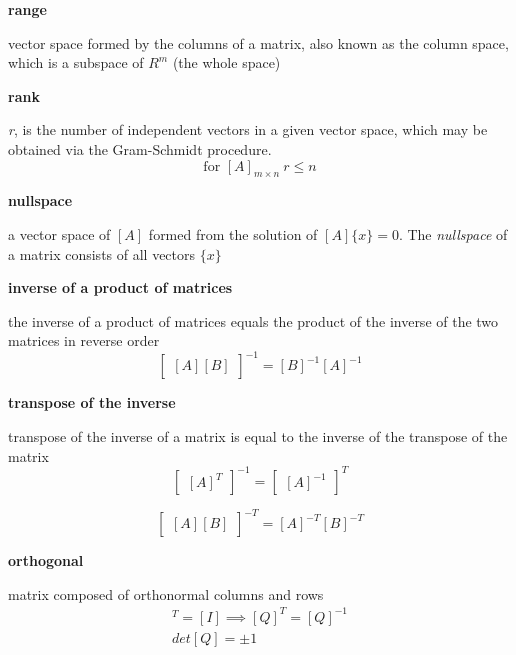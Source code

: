 \documentclass[letterpaper,reqno,oneside]{amsart}
\newenvironment{dd}[1]{
	\noindent
	\textbf{\normalsize{#1}}
	\hspace{0.1in}
	\small
	\rmfamily
	}
	{\medskip}
\begin{document}
\begin{dd}{range}
vector space formed by the columns of a matrix, also known as the column space, which is a subspace of $R^m$ (the whole space)
\end{dd}

\begin{dd}{rank}
\emph{r}, is the number of independent vectors in a given vector space, which may be obtained via the Gram-Schmidt procedure. $$\text{for } [A]_{m \times n} \ r \le n$$
\end{dd}

\begin{dd}{nullspace}
a vector space of $[A]$ formed from the solution of $[A]\{x\} = 0$. The \emph{nullspace} of a matrix consists of all vectors $\{x\}$ 
\end{dd}

\begin{dd}{inverse of a product of matrices}
the inverse of a product of matrices equals the product of the inverse of the two matrices in reverse order
\[
\begin{bmatrix}
[A][B]
\end{bmatrix}^{-1}
 = [B]^{-1}[A]^{-1} \]
\end{dd}

\begin{dd}{transpose of the inverse}
transpose of the inverse of a matrix is equal to the inverse of the transpose of the matrix
\[
\begin{bmatrix}
[A]^T
\end{bmatrix}^{-1}
 = 
 \begin{bmatrix}
[A]^{-1}
\end{bmatrix}^{T}
\]

\[
\begin{bmatrix}
[A][B]
\end{bmatrix}^{-T}
 = [A]^{-T}[B]^{-T} \]
\end{dd}

\begin{dd}{orthogonal}
matrix composed of orthonormal columns and rows
\begin{gather*}
[Q][Q]^T=[I] \implies [Q]^T = [Q]^{-1}\\
det[Q] = \pm 1
\end{gather*}
\end{dd}
\end{document}
